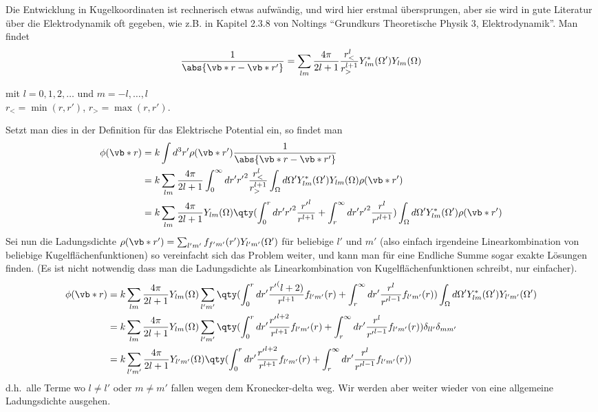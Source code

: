 Die Entwicklung in Kugelkoordinaten ist rechnerisch etwas aufwändig, und
wird hier erstmal übersprungen, aber sie wird in gute Literatur über
die Elektrodynamik oft gegeben, wie z.B. in Kapitel 2.3.8 von Noltings
``Grundkurs Theoretische Physik 3, Elektrodynamik''. 
Man findet 
\begin{equation}
  \frac{1}{\abs{\vb*r-\vb*r'}}
  =
  \sum_{lm} \frac{4\pi}{2l+1} \frac{r_<^l}{r_>^{l+1}}
  Y^*_{lm}(\Omega')Y_{lm}(\Omega)
\end{equation}
\begin{center}
mit $l=0,1,2,\ldots$ und $m=-l,\ldots,l$\\
$r_<=\min(r,r')$, $r_>=\max(r,r')$.
\end{center}
Setzt man dies in der Definition für das Elektrische Potential ein, 
so findet man
\begin{equation}
  \begin{split}
    \phi(\vb*r) 
    &= k\int d^3r' \rho(\vb*r') \frac{1}{\abs{\vb*r-\vb*r'}} \\
    &= k\sum_{lm} \frac{4\pi}{2l+1} 
    \int_0^\infty dr'{r'}^2 \frac{r_<^l}{r_>^{l+1}} 
    \int_\Omega d\Omega' Y^*_{lm}(\Omega')Y_{lm}(\Omega) \rho(\vb*r')\\
    &= k\sum_{lm} \frac{4\pi}{2l+1} Y_{lm}(\Omega) 
    \qty(
    \int_0^{r} dr'{r'}^2 \frac{{r'}^l}{r^{l+1}} +
    \int_{r}^{\infty} dr'{r'}^2 \frac{r^l}{{r'}^{l+1}} 
    )
    \int_\Omega d\Omega' Y^*_{lm}(\Omega')\rho(\vb*r')\\
  \end{split}
\end{equation}
Sei nun die Ladungsdichte 
$\rho(\vb*r')=\sum_{l'm'}f_{f'm'}(r')Y_{l'm'}(\Omega')$
für beliebige $l'$ und $m'$ (also einfach irgendeine Linearkombination von
beliebige Kugelflächenfunktionen) so vereinfacht sich das Problem weiter,
und kann man für eine Endliche Summe sogar exakte Lösungen finden.
(Es ist nicht notwendig dass man die Ladungsdichte als Linearkombination
von Kugelflächenfunktionen schreibt, nur einfacher).
\begin{equation}
  \begin{split}
    \phi(\vb*r) 
    &= k\sum_{lm} \frac{4\pi}{2l+1} Y_{lm}(\Omega) \sum_{l'm'}
    \qty(
    \int_0^{r} dr'\frac{{r'}^(l+2)}{r^{l+1}}f_{l'm'}(r) +
    \int_{r}^{\infty} dr'\frac{r^l}{{r'}^{l-1}}f_{l'm'}(r) 
    )
    \int_\Omega d\Omega' Y^*_{lm}(\Omega')Y_{l'm'}(\Omega')\\
    &= k\sum_{lm} \frac{4\pi}{2l+1} Y_{lm}(\Omega) \sum_{l'm'}
    \qty(
    \int_0^{r} dr'\frac{{r'}^{l+2}}{r^{l+1}}f_{l'm'}(r) +
    \int_{r}^{\infty} dr'\frac{r^l}{{r'}^{l-1}}f_{l'm'}(r) 
    )
    \delta_{ll'}\delta_{mm'}\\
    &= k\sum_{l'm'} \frac{4\pi}{2l+1} Y_{l'm'}(\Omega)
    \qty(
    \int_0^{r} dr'\frac{{r'}^{l+2}}{r^{l+1}}f_{l'm'}(r) +
    \int_{r}^{\infty} dr'\frac{r^l}{{r'}^{l-1}}f_{l'm'}(r) 
    )
  \end{split}
\end{equation}
d.h.\ alle Terme wo $l\neq l'$ oder $m\neq m'$ fallen wegen dem Kronecker-delta weg. Wir werden aber weiter wieder von eine allgemeine Ladungsdichte 
ausgehen.

